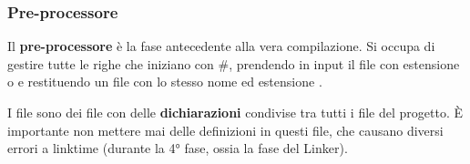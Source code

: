 \documentclass[11pt, a4paper, titlepage, oneside]{scrbook}
\begin{document}
\subsubsection*{Pre-processore}

\begin{Definizione}
\label{def-pre-processore}
Il \textbf{pre-processore} è la fase antecedente alla vera compilazione. Si occupa di gestire tutte le righe che iniziano con \#, prendendo in input il file con estensione  o  e restituendo un file con lo stesso nome ed estensione .
\end{Definizione}

\NB I file  sono dei file con delle \textbf{dichiarazioni} condivise tra tutti i file del progetto. È importante non mettere mai delle definizioni in questi file, che causano diversi errori a linktime (durante la 4° fase, ossia la fase del Linker). 
\end{document}
